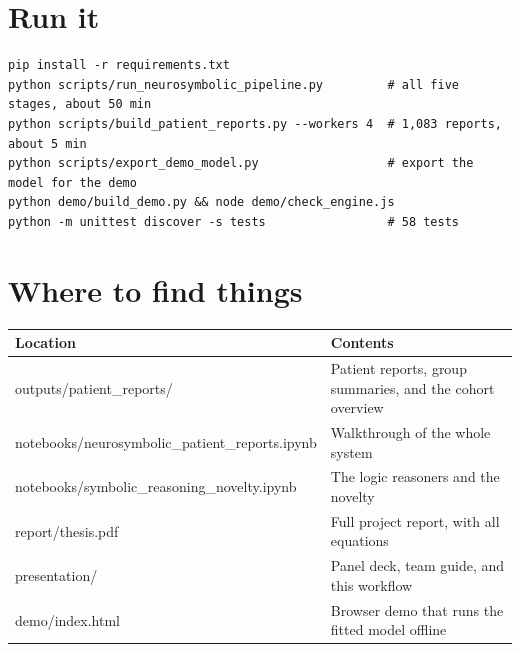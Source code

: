 \documentclass[10.5pt,a4paper]{article}
\begin{document}
\section{Run it}
\small
\begin{verbatim}
pip install -r requirements.txt
python scripts/run_neurosymbolic_pipeline.py         # all five stages, about 50 min
python scripts/build_patient_reports.py --workers 4  # 1,083 reports, about 5 min
python scripts/export_demo_model.py                  # export the model for the demo
python demo/build_demo.py && node demo/check_engine.js
python -m unittest discover -s tests                 # 58 tests
\end{verbatim}
\normalsize

\section{Where to find things}
\small
\begin{tabularx}{\textwidth}{>{\raggedright\scriptsize\ttfamily}p{7.0cm}Y}
\toprule
\normalfont Location & Contents \\
\midrule
outputs/patient\_reports/ & Patient reports, group summaries, and the cohort overview \\
notebooks/neurosymbolic\_patient\_reports.ipynb & Walkthrough of the whole system \\
notebooks/symbolic\_reasoning\_novelty.ipynb & The logic reasoners and the novelty \\
report/thesis.pdf & Full project report, with all equations \\
presentation/ & Panel deck, team guide, and this workflow \\
demo/index.html & Browser demo that runs the fitted model offline \\
\bottomrule
\end{tabularx}
\end{document}
